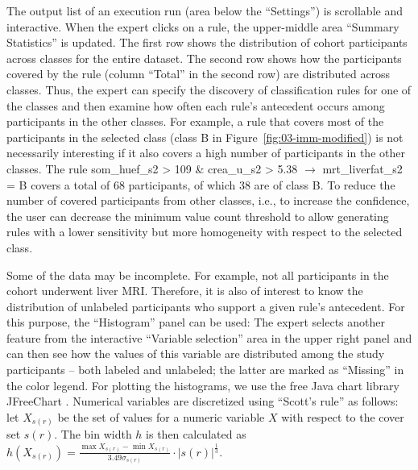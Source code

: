 \documentclass[
  oneside]{book}
\begin{document}
The output list of an execution run (area below the ``Settings'') is scrollable and interactive.
When the expert clicks on a rule, the upper-middle area ``Summary Statistics'' is updated.
The first row shows the distribution of cohort participants across classes for the entire dataset.
The second row shows how the participants covered by the rule (column ``Total'' in the second row) are distributed across classes.
Thus, the expert can specify the discovery of classification rules for one of the classes and then examine how often each rule's antecedent occurs among participants in the other classes.
For example, a rule that covers most of the participants in the selected class (class B in Figure~\ref{fig:03-imm-modified}) is not necessarily interesting if it also covers a high number of participants in the other classes.
The rule som\_huef\_s2 \textgreater{} 109 \& crea\_u\_s2 \textgreater{} 5.38 \(\longrightarrow\) mrt\_liverfat\_s2 = B covers a total of 68 participants, of which 38 are of class B.
To reduce the number of covered participants from other classes, i.e., to increase the confidence, the user can decrease the minimum value count threshold to allow generating rules with a lower sensitivity but more homogeneity with respect to the selected class.

Some of the data may be incomplete.
For example, not all participants in the cohort underwent liver MRI.
Therefore, it is also of interest to know the distribution of unlabeled participants who support a given rule's antecedent.
For this purpose, the ``Histogram'' panel can be used: The expert selects another feature from the interactive ``Variable selection'' area in the upper right panel and can then see how the values of this variable are distributed among the study participants -- both labeled and unlabeled; the latter are marked as ``Missing'' in the color legend.
For plotting the histograms, we use the free Java chart library JFreeChart \autocite{GilbertJFree}.
Numerical variables are discretized using ``Scott's rule'' \autocite{scott1979optimal} as follows:
let \(X_{s(r)}\) be the set of values for a numeric variable \(X\) with respect to the cover set \(s(r)\).
The bin width \(h\) is then calculated as \(h(X_{s(r)})=\frac{\max{X_{s(r)}}-\min{X_{s(r)}}}{3.49\sigma_{s(r)}}\cdot |s(r)|^{\frac{1}{3}}\).
\end{document}
